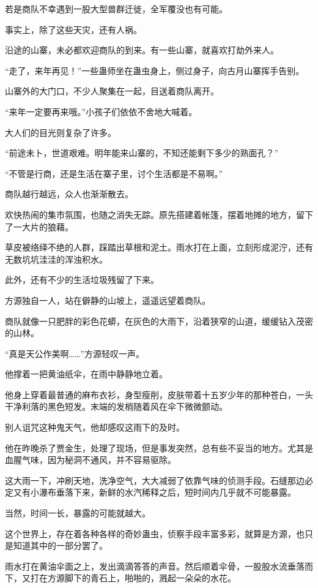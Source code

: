 \begin{this_body}
若是商队不幸遇到一股大型兽群迁徙，全军覆没也有可能。

事实上，除了这些天灾，还有人祸。

沿途的山寨，未必都欢迎商队的到来。有一些山寨，就喜欢打劫外来人。

“走了，来年再见！”一些蛊师坐在蛊虫身上，侧过身子，向古月山寨挥手告别。

山寨外的大门口，不少人聚集在一起，目送着商队离开。

“来年一定要再来哦。”小孩子们依依不舍地大喊着。

大人们的目光则复杂了许多。

“前途未卜，世道艰难。明年能来山寨的，不知还能剩下多少的熟面孔？”

“不管是行商，还是生活在寨子里，讨个生活都是不易啊。”

商队越行越远，众人也渐渐散去。

欢快热闹的集市氛围，也随之消失无踪。原先搭建着帐篷，摆着地摊的地方，留下了一大片的狼藉。

草皮被络绎不绝的人群，踩踏出草根和泥土。雨水打在上面，立刻形成泥泞，还有无数坑坑洼洼的浑浊积水。

此外，还有不少的生活垃圾残留了下来。

方源独自一人，站在僻静的山坡上，遥遥远望着商队。

商队就像一只肥胖的彩色花蟒，在灰色的大雨下，沿着狭窄的山道，缓缓钻入茂密的山林。

“真是天公作美啊……”方源轻叹一声。

他撑着一把黄油纸伞，在雨中静静地立着。

他身上穿着最普通的麻布衣衫，身型瘦削，皮肤带着十五岁少年的那种苍白，一头干净利落的黑色短发。末端的发梢随着风在伞下微微颤动。

别人诅咒这种鬼天气，他却感叹这雨下的及时。

他在昨晚杀了贾金生，处理了现场，但是事发突然，总有些不妥当的地方。尤其是血腥气味，因为秘洞不通风，并不容易驱除。

这大雨一下，冲刷天地，洗净空气，大大减弱了依靠气味的侦测手段。石缝那边必定又有小瀑布垂落下来，新鲜的水汽稀释之后，短时间内几乎就不可能暴露。

当然，时间一长，暴露的可能就越大。

这个世界上，存在着各种各样的奇妙蛊虫，侦察手段丰富多彩，就算是方源，也只是知道其中的一部分罢了。

雨水打在黄油伞面之上，发出滴滴答答的声音。然后顺着伞骨，一股股水流垂落而下，又打在方源脚下的青石上，啪啪的，溅起一朵朵的水花。


\end{this_body}
